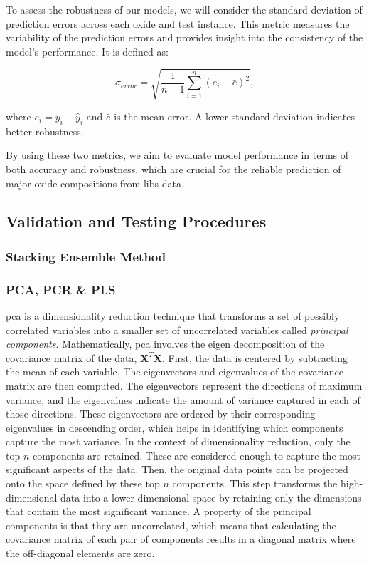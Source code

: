 To assess the robustness of our models, we will consider the standard deviation of prediction errors across each oxide and test instance. This metric measures the variability of the prediction errors and provides insight into the consistency of the model's performance. It is defined as:

\begin{equation}
    \sigma_{error} = \sqrt{\frac{1}{n-1} \sum_{i=1}^{n} (e_i - \bar{e})^2},
\end{equation}

where $e_i = y_i - \hat{y}_i$ and $\bar{e}$ is the mean error. A lower standard deviation indicates better robustness.

By using these two metrics, we aim to evaluate model performance in terms of both accuracy and robustness, which are crucial for the reliable prediction of major oxide compositions from \gls{libs} data.

\subsection{Validation and Testing Procedures}

\subsubsection{Stacking Ensemble Method}


\subsubsection{PCA, PCR \& PLS}
\gls{pca} is a dimensionality reduction technique that transforms a set of possibly correlated variables into a smaller set of uncorrelated variables called \textit{principal components}.
Mathematically, \gls{pca} involves the eigen decomposition of the covariance matrix of the data, $\mathbf{X}^T \mathbf{X}$.
First, the data is centered by subtracting the mean of each variable.
The eigenvectors and eigenvalues of the covariance matrix are then computed.
The eigenvectors represent the directions of maximum variance, and the eigenvalues indicate the amount of variance captured in each of those directions.
These eigenvectors are ordered by their corresponding eigenvalues in descending order, which helps in identifying which components capture the most variance.
In the context of dimensionality reduction, only the top $n$ components are retained.
These are considered enough to capture the most significant aspects of the data.
Then, the original data points can be projected onto the space defined by these top $n$ components.
This step transforms the high-dimensional data into a lower-dimensional space by retaining only the dimensions that contain the most significant variance.
A property of the principal components is that they are uncorrelated, which means that calculating the covariance matrix of each pair of components results in a diagonal matrix where the off-diagonal elements are zero.

